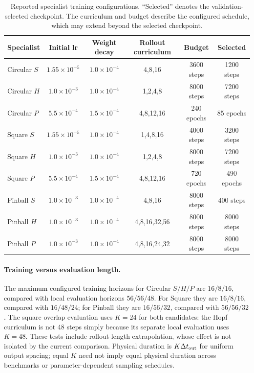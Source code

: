 \documentclass{article}
\begin{document}
\par
\begin{table}[H]
\centering
\caption{
Reported specialist training configurations. ``Selected'' denotes the validation-selected checkpoint. The curriculum and budget describe the configured schedule, which may extend beyond the selected checkpoint.
}
\label{tab:specialist_training}
\small
\setlength{\tabcolsep}{3.5pt}
\begin{tabular}{@{}lccccc@{}}
\toprule
Specialist & Initial lr & Weight decay & Rollout curriculum & Budget & Selected \\
\midrule
Circular $S$
& $1.55{\times}10^{-5}$ & $1.0{\times}10^{-4}$
& 4,8,16 & 3600 steps & 1200 steps \\
Circular $H$
& $1.0{\times}10^{-3}$ & $1.0{\times}10^{-4}$
& 1,2,4,8 & 8000 steps & 7200 steps \\
Circular $P$
& $5.5{\times}10^{-4}$ & $1.5{\times}10^{-4}$
& 4,8,12,16 & 240 epochs & 85 epochs \\
\addlinespace
Square $S$
& $1.55{\times}10^{-5}$ & $1.0{\times}10^{-4}$
& 1,4,8,16 & 4000 steps & 3200 steps \\
Square $H$
& $1.0{\times}10^{-3}$ & $1.0{\times}10^{-4}$
& 1,2,4,8 & 8000 steps & 7200 steps \\
Square $P$
& $5.5{\times}10^{-4}$ & $1.5{\times}10^{-4}$
& 4,8,12,16 & 720 epochs & 490 epochs \\
\addlinespace
Pinball $S$
& $1.0{\times}10^{-3}$ & $1.0{\times}10^{-4}$
& 4,8,16 & 8000 steps & 400 steps \\
Pinball $H$
& $1.0{\times}10^{-3}$ & $1.0{\times}10^{-4}$
& 4,8,16,32,56 & 8000 steps & 8000 steps \\
Pinball $P$
& $1.0{\times}10^{-3}$ & $1.0{\times}10^{-4}$
& 4,8,16,24,32 & 8000 steps & 8000 steps \\
\bottomrule
\end{tabular}
\end{table}
\par

\paragraph{Training versus evaluation length.}
The maximum configured training horizons for Circular $S/H/P$ are $16/8/16$, compared with local evaluation horizons $56/56/48$. For Square they are $16/8/16$, compared with $16/48/24$; for Pinball they are $16/56/32$, compared with $56/56/32$. The square overlap evaluation uses $K=24$ for both candidates: the Hopf curriculum is not $48$ steps simply because its separate local evaluation uses $K=48$. These tests include rollout-length extrapolation, whose effect is not isolated by the current comparison. Physical duration is $K\Delta t_{\rm out}$ for uniform output spacing; equal $K$ need not imply equal physical duration across benchmarks or parameter-dependent sampling schedules.
\end{document}
